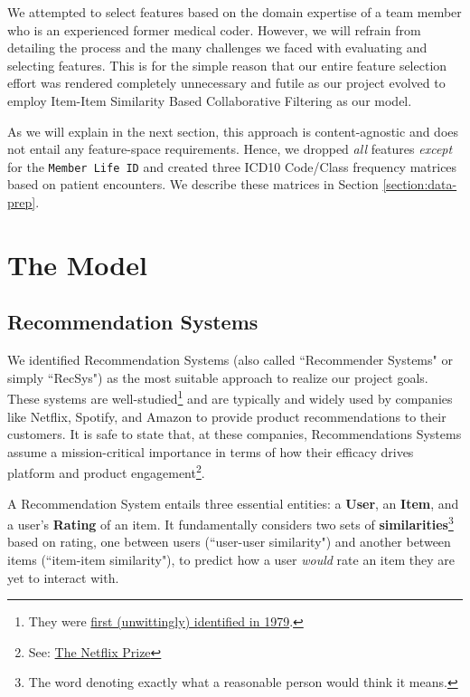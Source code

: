 \documentclass[twoside,11pt]{article}
\begin{document}
We attempted to select features based on the domain expertise of a team member who is an experienced former medical coder. However, we will refrain from detailing the process and the many challenges we faced with evaluating and selecting features. This is for the simple reason that our entire feature selection effort was rendered completely unnecessary and futile as our project evolved to employ Item-Item Similarity Based Collaborative Filtering as our model.

As we will explain in the next section, this approach is content-agnostic and does not entail any feature-space requirements. Hence, we dropped \textit{all} features \textit{except} for the \texttt{Member Life ID} and created three ICD10 Code/Class frequency matrices based on patient encounters. We describe these matrices in Section \ref{section:data-prep}.


\section{The Model}

\subsection{Recommendation Systems}

We identified Recommendation Systems (also called ``Recommender Systems" or simply ``RecSys") as the most suitable approach to realize our project goals. These systems are well-studied\footnote{They were \href{https://en.wikipedia.org/wiki/Recommender_system\#History}{first (unwittingly) identified in 1979}.} and are typically and widely used by companies like Netflix, Spotify, and Amazon to provide product recommendations to their customers. It is safe to state that, at these companies, Recommendations Systems assume a mission-critical importance in terms of how their efficacy drives platform and product engagement\footnote{See: \href{https://en.wikipedia.org/wiki/Netflix_Prize}{The Netflix Prize}}.

A Recommendation System entails three essential entities: a \textbf{User}, an \textbf{Item}, and a user's \textbf{Rating} of an item. It fundamentally considers two sets of \textbf{similarities}\footnote{The word denoting exactly what a reasonable person would think it means.} based on rating, one between users (``user-user similarity") and another between items (``item-item similarity"), to predict how a user \textit{would} rate an item they are yet to interact with.
\end{document}

